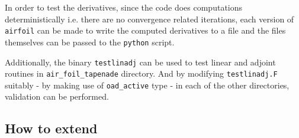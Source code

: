 \noindent In order to test the derivatives, since the code does computations deterministically i.e. there are no convergence related iterations, each version of \texttt{airfoil} can be made to write the computed derivatives to a file and the files themselves can be passed to the \texttt{python} script.\\

\begin{TodoPar}
\noindent Additionally, the binary \texttt{testlinadj} can be used to test linear and adjoint routines in \texttt{air\_foil\_tapenade} directory. And by modifying \texttt{testlinadj.F} suitably - by making use of \texttt{oad\_active} type - in each of the other directories, validation can be performed.
\end{TodoPar}
\subsection{How to extend}
